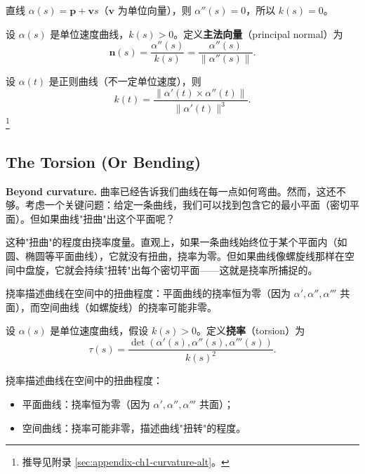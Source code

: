 \begin{Example}[直线的曲率]\label{ex:line-curvature-ch1}
直线 $\alpha(s) = \mathbf{p} + \mathbf{v}s$（$\mathbf{v}$ 为单位向量），则 $\alpha''(s) = 0$，所以 $k(s) = 0$。
\end{Example}

\begin{Definition}[主法向量]\label{def:principal-normal}
设 $\alpha(s)$ 是单位速度曲线，$k(s) > 0$。定义\textbf{主法向量}（principal normal）为
\[
\mathbf{n}(s) = \frac{\alpha''(s)}{k(s)} = \frac{\alpha''(s)}{\|\alpha''(s)\|}.
\]
\end{Definition}

\begin{Proposition}[曲率的另一个表达式]\label{prop:curvature-alternative}
设 $\alpha(t)$ 是正则曲线（不一定单位速度），则
\[
k(t) = \frac{\|\alpha'(t) \times \alpha''(t)\|}{\|\alpha'(t)\|^3}.
\]\footnote{推导见附录 \cref{sec:appendix-ch1-curvature-alt}。}
\end{Proposition}

\subsection{The Torsion (Or Bending)}\label{sec:torsion}

\textbf{Beyond curvature.} 曲率已经告诉我们曲线在每一点如何弯曲。然而，这还不够。考虑一个关键问题：给定一条曲线，我们可以找到包含它的最小平面（密切平面）。但如果曲线"扭曲"出这个平面呢？

这种"扭曲"的程度由挠率度量。直观上，如果一条曲线始终位于某个平面内（如圆、椭圆等平面曲线），它就没有扭曲，挠率为零。但如果曲线像螺旋线那样在空间中盘旋，它就会持续"扭转"出每个密切平面——这就是挠率所捕捉的。

挠率描述曲线在空间中的扭曲程度：平面曲线的挠率恒为零（因为 $\alpha', \alpha'', \alpha'''$ 共面），而空间曲线（如螺旋线）的挠率可能非零。

\begin{Definition}[挠率]\label{def:torsion-ch1}
设 $\alpha(s)$ 是单位速度曲线，假设 $k(s) > 0$。定义\textbf{挠率}（torsion）为
\[
\tau(s) = \frac{\det(\alpha'(s), \alpha''(s), \alpha'''(s))}{k(s)^2}.
\]
\end{Definition}

\begin{Remark}
挠率描述曲线在空间中的扭曲程度：
\begin{itemize}
\item 平面曲线：挠率恒为零（因为 $\alpha', \alpha'', \alpha'''$ 共面）；
\item 空间曲线：挠率可能非零，描述曲线"扭转"的程度。
\end{itemize}
\end{Remark}


